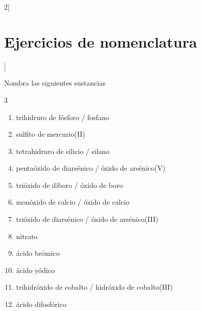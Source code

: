 \documentclass[10pt]{article}
\begin{document}
\begin{multicols*}{2}[
  \section{Ejercicios de nomenclatura}
  ]
\begin{exercise}[
    tags    = {inorgánica,nomenclatura,múltiple,2B},
    topics  = {química inorgánica,formulación,nomenclatura},
    source  = {Química 2B SAN 2016, p372, e8},
  ]
  Nombra las siguientes sustancias

  \begin{enumerate}\begin{multicols}{3}
    \item {}
    \item {}
    \item {}
    \item {}
    \item {}
    \item {}
    \item {}
    \item {}
    \item {}
    \item {}
    \item {}
    \item {}
  \end{multicols}\end{enumerate}
\end{exercise}

\begin{solution}
  \begin{enumerate}
    \item trihidruro de fósforo / fosfano
    \item sulfito de mercurio(II)
    \item tetrahidruro de silicio / silano
    \item pentaóxido de diarsénico / óxido de arsénico(V)
    \item trióxido de diboro / óxido de boro
    \item monóxido de calcio / óxido de calcio
    \item trióxido de diarsénico / óxido de arsénico(III)
    \item nitrato
    \item ácido brómico
    \item ácido yódico
    \item trihidróxido de cobalto / hidróxido de cobalto(III)
    \item ácido difosfórico
  \end{enumerate}
\end{solution}





\end{multicols*}
\end{document}
